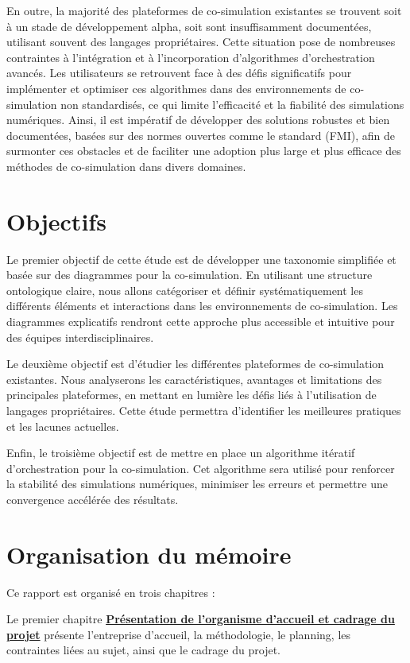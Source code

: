 En outre, la majorité des plateformes de co-simulation existantes se trouvent soit à un stade de développement alpha, soit sont insuffisamment documentées, utilisant souvent des langages propriétaires. Cette situation pose de nombreuses contraintes à l'intégration et à l'incorporation d'algorithmes d'orchestration avancés. Les utilisateurs se retrouvent face à des défis significatifs pour implémenter et optimiser ces algorithmes dans des environnements de co-simulation non standardisés, ce qui limite l'efficacité et la fiabilité des simulations numériques. Ainsi, il est impératif de développer des solutions robustes et bien documentées, basées sur des normes ouvertes comme le standard (FMI), afin de surmonter ces obstacles et de faciliter une adoption plus large et plus efficace des méthodes de co-simulation dans divers domaines.

\section*{Objectifs}
Le premier objectif de cette étude est de développer une taxonomie simplifiée et basée sur des diagrammes pour la co-simulation. En utilisant une structure ontologique claire, nous allons catégoriser et définir systématiquement les différents éléments et interactions dans les environnements de co-simulation. Les diagrammes explicatifs rendront cette approche plus accessible et intuitive pour des équipes interdisciplinaires.

Le deuxième objectif est d'étudier les différentes plateformes de co-simulation existantes. Nous analyserons les caractéristiques, avantages et limitations des principales plateformes, en mettant en lumière les défis liés à l'utilisation de langages propriétaires. Cette étude permettra d'identifier les meilleures pratiques et les lacunes actuelles.

Enfin, le troisième objectif est de mettre en place un algorithme itératif d'orchestration pour la co-simulation. Cet algorithme sera utilisé pour renforcer la stabilité des simulations numériques, minimiser les erreurs et permettre une convergence accélérée des résultats.
\section*{Organisation du mémoire}

Ce rapport est organisé en trois chapitres :

Le premier chapitre \og \textbf{\hyperref[sec:pré]{Présentation de l'organisme d'accueil et cadrage du projet}} \fg présente l'entreprise d'accueil, la méthodologie, le planning, les contraintes liées au sujet, ainsi que le cadrage du projet.

